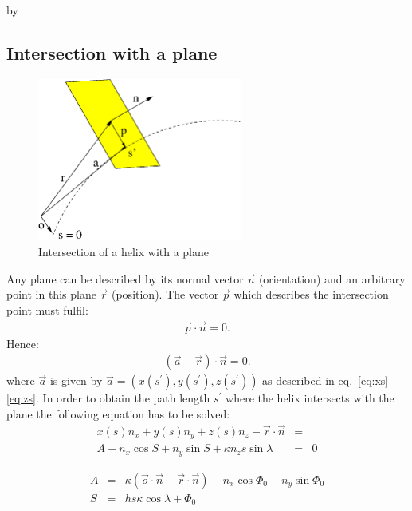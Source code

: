 \documentclass[twoside]{article}
\newcommand{\entrylabel}[1]{\mbox{\textbf{{#1}}}\hfil}%
\newenvironment{entry}
{\begin{list}{}%
    {\renewcommand{\makelabel}{\entrylabel}%
     \setlength{\labelwidth}{90pt}%
     \setlength{\leftmargin}{\labelwidth}
     \advance\leftmargin by \labelsep%
      }%
    }%
  {\end{list}}
\newcommand{\Entrylabel}[1]%
{\raisebox{0pt}[1ex][0pt]{\makebox[\labelwidth][l]%
    {\parbox[t]{\labelwidth}{\hspace{0pt}\textbf{{#1}}}}}}
\newenvironment{Entry}%
{\renewcommand{\entrylabel}{\Entrylabel}\begin{entry}}%
  {\end{entry}}
\begin{document}
\begin{description}
\begin{Entry}
\subsection{Intersection with a plane}

\begin{figure}[thb]
    \begin{center}
        \includegraphics[width=0.6\textwidth]{helix3.eps}
        \caption{Intersection of a helix with a plane}
        \label{fig:plane}
    \end{center}
\end{figure}

Any plane can be described by its normal vector $\vec{n}$
(orientation) and an arbitrary point in this plane $\vec{r}$ (position). The vector
$\vec{p}$ which describes the intersection point must fulfil:
\begin{eqnarray}
    \vec{p} \cdot \vec{n} = 0.
\end{eqnarray}
Hence:
\begin{eqnarray}
    (\vec{a}-\vec{r}) \cdot \vec{n} = 0. \label{eq:ansatz}
\end{eqnarray}
where $\vec{a}$ is given by $\vec{a} = (x(s^{\prime}),
y(s^{\prime}), z(s^{\prime}))$ as described in
eq.~\ref{eq:xs}--\ref{eq:zs}.  In order to obtain the path length
$s^{\prime}$ where the helix intersects with the plane the
following equation has to be solved:
\begin{eqnarray}
    x(s) n_x + y(s) n_y + z(s) n_z - \vec{r} \cdot \vec{n} &=& \\
    A + n_x \cos S
    + n_y \sin S
    + \kappa n_z s \sin \lambda &=& 0 \label{eq:inter}
\end{eqnarray}

\begin{eqnarray}
    A &=& \kappa (\vec{o} \cdot \vec{n} - \vec{r} \cdot \vec{n}) - n_x \cos \Phi_0 - n_y \sin \Phi_0 \\
    S &=& h s \kappa \cos \lambda + \Phi_0  
\end{eqnarray}


\end{Entry}
\end{description}
\end{document}
